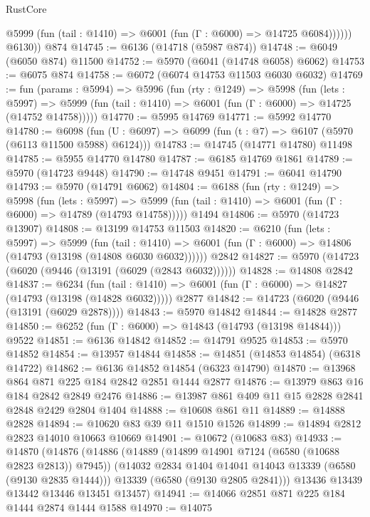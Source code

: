\begin{lexlean}{RustCore}
\begin{coremodule}
              @5999 (fun (tail : @1410) => @6001 (fun (Γ : @6000) => @14725 @6084))))))
        @6130))
    @874
@14745 := @6136 (@14718 (@5987 @874))
@14748 := @6049 (@6050 @874) @11500
@14752 := @5970 (@6041 (@14748 @6058) @6062)
@14753 := @6075 @874
@14758 := @6072 (@6074 @14753 @11503 @6030 @6032)
@14769 := fun (params : @5994) =>
  @5996
    (fun (rty : @1249) =>
    @5998
      (fun (lets : @5997) =>
      @5999 (fun (tail : @1410) => @6001 (fun (Γ : @6000) => @14725 (@14752 @14758)))))
@14770 := @5995 @14769
@14771 := @5992 @14770
@14780 := @6098
    (fun (U : @6097) => @6099 (fun (t : @7) => @6107 (@5970 (@6113 @11500 @5988) @6124)))
@14783 := @14745 (@14771 @14780) @11498
@14785 := @5955 @14770 @14780
@14787 := @6185 @14769 @1861
@14789 := @5970 (@14723 @9448)
@14790 := @14748 @9451
@14791 := @6041 @14790
@14793 := @5970 (@14791 @6062)
@14804 := @6188
    (fun (rty : @1249) =>
    @5998
      (fun (lets : @5997) =>
      @5999 (fun (tail : @1410) => @6001 (fun (Γ : @6000) => @14789 (@14793 @14758)))))
    @1494
@14806 := @5970 (@14723 @13907)
@14808 := @13199 @14753 @11503
@14820 := @6210
    (fun (lets : @5997) =>
    @5999
      (fun (tail : @1410) =>
      @6001 (fun (Γ : @6000) => @14806 (@14793 (@13198 (@14808 @6030 @6032))))))
    @2842
@14827 := @5970 (@14723 (@6020 (@9446 (@13191 (@6029 (@2843 @6032))))))
@14828 := @14808 @2842
@14837 := @6234
    (fun (tail : @1410) => @6001 (fun (Γ : @6000) => @14827 (@14793 (@13198 (@14828 @6032)))))
    @2877
@14842 := @14723 (@6020 (@9446 (@13191 (@6029 @2878))))
@14843 := @5970 @14842
@14844 := @14828 @2877
@14850 := @6252 (fun (Γ : @6000) => @14843 (@14793 (@13198 @14844))) @9522
@14851 := @6136 @14842
@14852 := @14791 @9525
@14853 := @5970 @14852
@14854 := @13957 @14844
@14858 := @14851 (@14853 @14854) (@6318 @14722)
@14862 := @6136 @14852 @14854 (@6323 @14790)
@14870 := @13968 @864 @871 @225 @184 @2842 @2851 @1444 @2877
@14876 := @13979 @863 @16 @184 @2842 @2849 @2476
@14886 := @13987 @861 @409 @11 @15 @2828 @2841 @2848 @2429 @2804 @1404
@14888 := @10608 @861 @11
@14889 := @14888 @2828
@14894 := @10620 @83 @39 @11 @1510 @1526
@14899 := @14894 @2812 @2823 @14010 @10663 @10669
@14901 := @10672 (@10683 @83)
@14933 := @14870
    (@14876
      (@14886
        (@14889 (@14899 @14901 @7124 (@6580 (@10688 @2823 @2813)) @7945))
        (@14032 @2834 @1404 @14041 @14043 @13339 (@6580 (@9130 @2835 @1444)))
        @13339
        (@6580 (@9130 @2805 @2841)))
      @13436
      @13439
      @13442
      @13446
      @13451
      @13457)
@14941 := @14066 @2851 @871 @225 @184 @1444 @2874 @1444 @1588
@14970 := @14075

\end{coremodule}
\end{lexlean}
